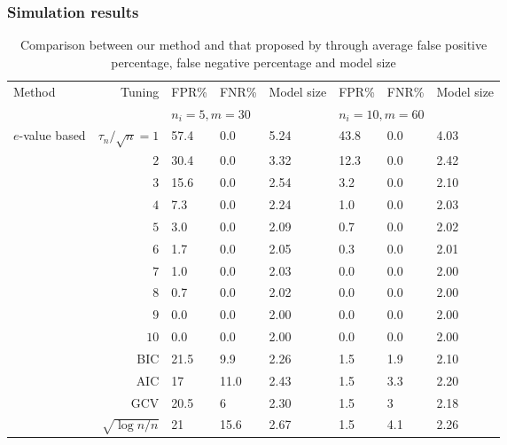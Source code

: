 \documentclass[10pt]{beamer}
\theoremstyle{definition}
\begin{document}
\begin{frame}
\frametitle{Simulation results}

\begin{table}[t]
	\centering
	\begin{scriptsize}
   \begin{tabular}{lr|lll|lll}
    \hline
    Method      & Tuning     & FPR\% & FNR\% & Model size & FPR\% & FNR\% & Model size \\ \cline{3-8}
    ~ & ~ & \multicolumn{3}{l|}{$n_i=5,m=30$} & \multicolumn{3}{l}{$n_i=10,m=60$}\\ \hline
  $e$-value based       & $\tau_n / \sqrt n = 1$      & 57.4     & 0.0   & 5.24       & 43.8     & 0.0   & 4.03       \\
    ~      & $2$      & 30.4     & 0.0   & 3.32       & 12.3     & 0.0   & 2.42       \\
    ~      & $3$      & 15.6     & 0.0   & 2.54       & 3.2      & 0.0   & 2.10       \\
    ~      & $4$      & 7.3      & 0.0   & 2.24       & 1.0      & 0.0   & 2.03       \\
    ~      & $5$      & 3.0     & 0.0   & 2.09       & 0.7   & 0.0   & 2.02       \\
    ~      & $6$      & 1.7     & 0.0   & 2.05       & 0.3   & 0.0   & 2.01       \\
    ~      & $7$      & 1.0   & 0.0   & 2.03       & 0.0   & 0.0   & 2.00       \\
    ~      & $8$      & 0.7   & 0.0   & 2.02       & 0.0   & 0.0   & 2.00       \\
    ~      & $9$      & 0.0   & 0.0   & 2.00       & 0.0   & 0.0   & 2.00       \\
    ~      & $10$      & 0.0   & 0.0   & 2.00       & 0.0   & 0.0   & 2.00       \\
     \hline
    \cite{PengLu12} & BIC    & 21.5  & 9.9   & 2.26       & 1.5   & 1.9   & 2.10       \\
    ~      & AIC    & 17    & 11.0  & 2.43       & 1.5   & 3.3   & 2.20       \\
    ~      & GCV    & 20.5  & 6     & 2.30       & 1.5   & 3     & 2.18       \\
    ~      & $\sqrt{\log n/n}$ & 21    & 15.6  & 2.67       & 1.5   & 4.1   & 2.26       \\ \hline
    \end{tabular}
    \caption*{Comparison between our method and that proposed by \cite{PengLu12} through average false positive percentage, false negative percentage and model size}
    \label{table:simtable1}
    \end{scriptsize}
\end{table}
%

\end{frame}
\end{document}
